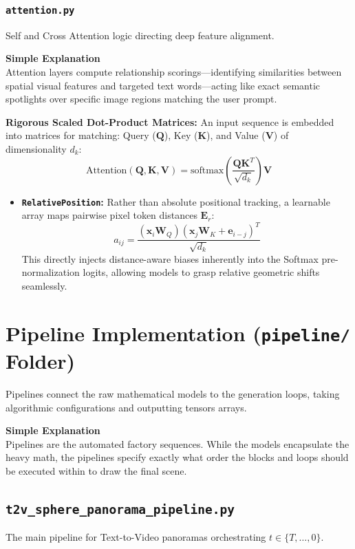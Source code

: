 \documentclass[11pt,a4paper]{article}
\begin{document}
\subsubsection{\texttt{attention.py}}
Self and Cross Attention logic directing deep feature alignment.

\begin{simplebox}
\textbf{Simple Explanation} \\
Attention layers compute relationship scorings—identifying similarities between spatial visual features and targeted text words—acting like exact semantic spotlights over specific image regions matching the user prompt.
\end{simplebox}

\textbf{Rigorous Scaled Dot-Product Matrices:}
An input sequence is embedded into matrices for matching: Query ($\mathbf{Q}$), Key ($\mathbf{K}$), and Value ($\mathbf{V}$) of dimensionality $d_k$:
\[ \text{Attention}(\mathbf{Q}, \mathbf{K}, \mathbf{V}) = \text{softmax} \left( \frac{\mathbf{Q} \mathbf{K}^T}{\sqrt{d_k}} \right) \mathbf{V} \]

\begin{itemize}
    \item \textbf{\texttt{RelativePosition}:} Rather than absolute positional tracking, a learnable array maps pairwise pixel token distances $\mathbf{E}_r$:
    \[ a_{ij} = \frac{(\mathbf{x}_i \mathbf{W}_Q)(\mathbf{x}_j \mathbf{W}_K + \mathbf{e}_{i-j})^T}{\sqrt{d_k}} \]
    This directly injects distance-aware biases inherently into the Softmax pre-normalization logits, allowing models to grasp relative geometric shifts seamlessly.
\end{itemize}


\section{Pipeline Implementation (\texttt{pipeline/} Folder)}
Pipelines connect the raw mathematical models to the generation loops, taking algorithmic configurations and outputting tensors arrays.

\begin{simplebox}
\textbf{Simple Explanation} \\
Pipelines are the automated factory sequences. While the models encapsulate the heavy math, the pipelines specify exactly what order the blocks and loops should be executed within to draw the final scene.
\end{simplebox}

\subsection{\texttt{t2v\_sphere\_panorama\_pipeline.py}}
The main pipeline for Text-to-Video panoramas orchestrating $t \in \{T, \dots, 0\}$.
\end{document}
